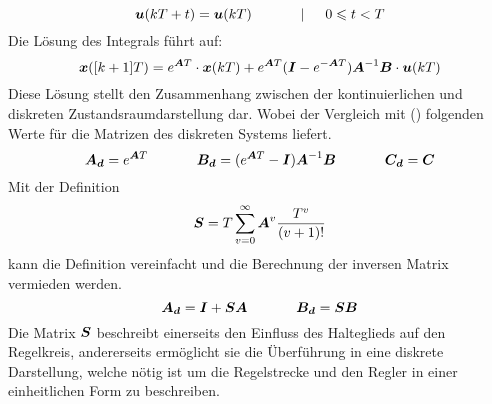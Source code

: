 \begin{equation}
\boldsymbol{u}(kT+t) = \boldsymbol{u}(kT) \hspace{35pt} \vert \hspace{15pt} 0 \leqslant t < T
\end{equation}
Die Lösung des Integrals führt auf:
\begin{equation}
\boldsymbol{x}([k+1]T) = e^{\boldsymbol{A}T}\cdot \boldsymbol{x}(kT) + e^{\boldsymbol{A}T}(\boldsymbol{I}-e^{-\boldsymbol{A}T})\boldsymbol{A}^{-1}\boldsymbol{B}\cdot \boldsymbol{u}(kT)
\end{equation}
Diese Lösung stellt den Zusammenhang zwischen der kontinuierlichen und diskreten Zustandsraumdarstellung dar. Wobei der Vergleich mit (\cite{eq_discrete_ss}) folgenden Werte für die Matrizen des diskreten Systems  liefert.
\begin{equation}
\boldsymbol{A_d} = e^{\boldsymbol{A}T} \hspace{35pt} \boldsymbol{B_d} = (e^{\boldsymbol{A}T}-\boldsymbol{I})\boldsymbol{A}^{-1}\boldsymbol{B} \hspace{35pt} \boldsymbol{C_d} = \boldsymbol{C}
\end{equation}
Mit der Definition
\begin{equation}
\boldsymbol{S} = T \sum^{\infty}_{v=0}\boldsymbol{A}^v\frac{T^v}{(v+1)!}
\end{equation}
kann die Definition vereinfacht und die Berechnung der inversen Matrix vermieden werden.
\begin{equation}
\boldsymbol{A_d} = \boldsymbol{I}+\boldsymbol{S}\boldsymbol{A}\hspace{35pt} \boldsymbol{B_d} = \boldsymbol{SB}
\end{equation}
Die Matrix $\boldsymbol{S}$ beschreibt einerseits den Einfluss des Halteglieds auf den Regelkreis, andererseits ermöglicht sie die Überführung in eine diskrete Darstellung, welche nötig ist um die Regelstrecke und den Regler in einer einheitlichen Form zu beschreiben. 